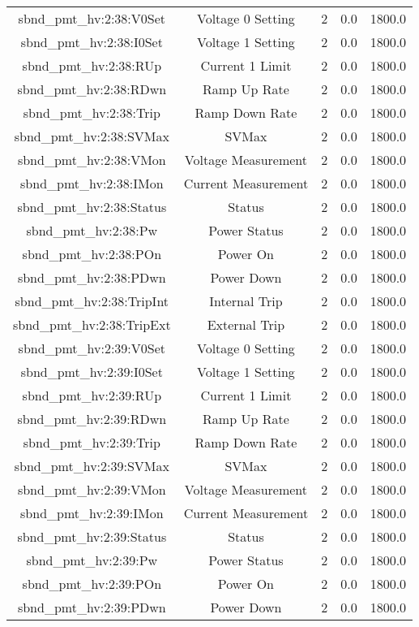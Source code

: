 \begin{center}
\begin{longtable}{c | c c c c }
sbnd\_pmt\_hv:2:38:V0Set & Voltage 0 Setting & 2 & 0.0 & 1800.0\\ 
sbnd\_pmt\_hv:2:38:I0Set & Voltage 1 Setting & 2 & 0.0 & 1800.0\\ 
sbnd\_pmt\_hv:2:38:RUp & Current 1 Limit & 2 & 0.0 & 1800.0\\ 
sbnd\_pmt\_hv:2:38:RDwn & Ramp Up Rate & 2 & 0.0 & 1800.0\\ 
sbnd\_pmt\_hv:2:38:Trip & Ramp Down Rate & 2 & 0.0 & 1800.0\\ 
sbnd\_pmt\_hv:2:38:SVMax & SVMax & 2 & 0.0 & 1800.0\\ 
sbnd\_pmt\_hv:2:38:VMon & Voltage Measurement & 2 & 0.0 & 1800.0\\ 
sbnd\_pmt\_hv:2:38:IMon & Current Measurement & 2 & 0.0 & 1800.0\\ 
sbnd\_pmt\_hv:2:38:Status & Status & 2 & 0.0 & 1800.0\\ 
sbnd\_pmt\_hv:2:38:Pw & Power Status & 2 & 0.0 & 1800.0\\ 
sbnd\_pmt\_hv:2:38:POn & Power On & 2 & 0.0 & 1800.0\\ 
sbnd\_pmt\_hv:2:38:PDwn & Power Down & 2 & 0.0 & 1800.0\\ 
sbnd\_pmt\_hv:2:38:TripInt & Internal Trip & 2 & 0.0 & 1800.0\\ 
sbnd\_pmt\_hv:2:38:TripExt & External Trip & 2 & 0.0 & 1800.0\\ 
sbnd\_pmt\_hv:2:39:V0Set & Voltage 0 Setting & 2 & 0.0 & 1800.0\\ 
sbnd\_pmt\_hv:2:39:I0Set & Voltage 1 Setting & 2 & 0.0 & 1800.0\\ 
sbnd\_pmt\_hv:2:39:RUp & Current 1 Limit & 2 & 0.0 & 1800.0\\ 
sbnd\_pmt\_hv:2:39:RDwn & Ramp Up Rate & 2 & 0.0 & 1800.0\\ 
sbnd\_pmt\_hv:2:39:Trip & Ramp Down Rate & 2 & 0.0 & 1800.0\\ 
sbnd\_pmt\_hv:2:39:SVMax & SVMax & 2 & 0.0 & 1800.0\\ 
sbnd\_pmt\_hv:2:39:VMon & Voltage Measurement & 2 & 0.0 & 1800.0\\ 
sbnd\_pmt\_hv:2:39:IMon & Current Measurement & 2 & 0.0 & 1800.0\\ 
sbnd\_pmt\_hv:2:39:Status & Status & 2 & 0.0 & 1800.0\\ 
sbnd\_pmt\_hv:2:39:Pw & Power Status & 2 & 0.0 & 1800.0\\ 
sbnd\_pmt\_hv:2:39:POn & Power On & 2 & 0.0 & 1800.0\\ 
sbnd\_pmt\_hv:2:39:PDwn & Power Down & 2 & 0.0 & 1800.0\\ 

\end{longtable}
\end{center}
